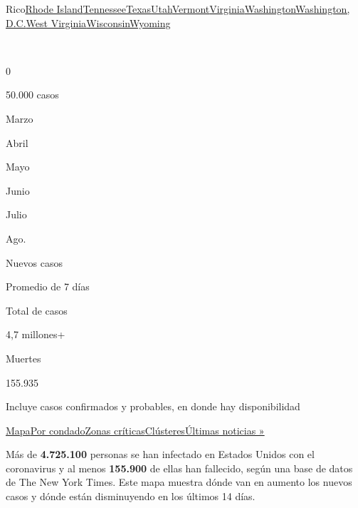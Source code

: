 {Rico}\href{https://www.nytimes3xbfgragh.onion/interactive/2020/us/rhode-island-coronavirus-cases.html}{Rhode
Island}\href{https://www.nytimes3xbfgragh.onion/interactive/2020/us/tennessee-coronavirus-cases.html}{Tennessee}\href{https://www.nytimes3xbfgragh.onion/interactive/2020/us/texas-coronavirus-cases.html}{Texas}\href{https://www.nytimes3xbfgragh.onion/interactive/2020/us/utah-coronavirus-cases.html}{Utah}\href{https://www.nytimes3xbfgragh.onion/interactive/2020/us/vermont-coronavirus-cases.html}{Vermont}\href{https://www.nytimes3xbfgragh.onion/interactive/2020/us/virginia-coronavirus-cases.html}{Virginia}\href{https://www.nytimes3xbfgragh.onion/interactive/2020/us/washington-coronavirus-cases.html}{Washington}\href{https://www.nytimes3xbfgragh.onion/interactive/2020/us/washington-dc-coronavirus-cases.html}{Washington,
D.C.}\href{https://www.nytimes3xbfgragh.onion/interactive/2020/us/west-virginia-coronavirus-cases.html}{West
Virginia}\href{https://www.nytimes3xbfgragh.onion/interactive/2020/us/wisconsin-coronavirus-cases.html}{Wisconsin}\href{https://www.nytimes3xbfgragh.onion/interactive/2020/us/wyoming-coronavirus-cases.html}{Wyoming}

~

0

50.000 casos

Marzo

Abril

Mayo

Junio

Julio

Ago.

Nuevos casos

Promedio de 7 días

Total de casos

4,7 millones+

Muertes

155.935

Incluye casos confirmados y probables, en donde hay disponibilidad

\protect\hyperlink{map}{Mapa}\protect\hyperlink{states}{Por
condado}\protect\hyperlink{hotspots}{Zonas
críticas}\protect\hyperlink{clusters}{Clústeres}\href{https://www.nytimes3xbfgragh.onion/2020/08/03/world/coronavirus-covid-19.html}{Últimas
noticias »}

Más de \textbf{4.725.100} personas se han infectado en Estados Unidos
con el coronavirus y al menos \textbf{155.900} de ellas han fallecido,
según una base de datos de The New York Times. Este mapa muestra dónde
van en aumento los nuevos casos y dónde están disminuyendo en los
últimos 14 días.

